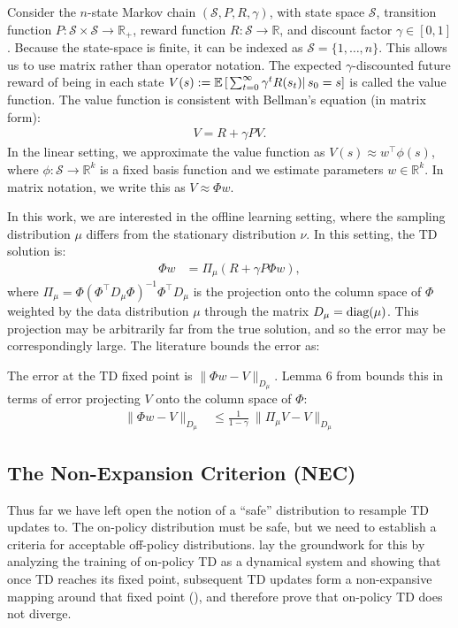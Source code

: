 Consider the $n$-state Markov chain $(\mathcal S, P, R, \gamma)$, with state space $\mathcal S$, transition function $P : \mathcal{S} \times \mathcal{S} \to \mathbb{R}_+$, reward function $R : \mathcal S \to \mathbb R$, and discount factor $\gamma \in [0, 1]$.
Because the state-space is finite, it can be indexed as $\mathcal{S} = \{1, \ldots, n\}$.
This allows us to use matrix rather than operator notation.
The expected $\gamma$-discounted future reward of being in each state $V(s) := \mathbb{E} \left[\left.\sum_{t=0}^\infty \gamma^t R(s_t) \right| s_0 = s \right]$ is called the value function.
The value function is consistent with Bellman's equation (in matrix form):
\begin{align}
  V = R + \gamma P V .
\end{align}
In the linear setting, we approximate the value function as $V(s) \approx w^\top \phi(s)$, where $\phi : \mathcal S \to \mathbb R^{k}$ is a fixed basis function and we estimate parameters $w \in \mathbb R^k$. In matrix notation, we write this as $V \approx \Phi w$.

In this work, we are interested in the offline learning setting, where the sampling distribution $\mu$ differs from the stationary distribution $\nu$.
In this setting, the TD solution is:
\begin{align}
  \Phi w & = \Pi_{\mu} (R + \gamma P \Phi w) ,
\end{align}
where $\Pi_\mu = \Phi(\Phi^\top D_{\mu} \Phi)^{-1}\Phi^\top D_{\mu}$ is the projection onto the column space of $\Phi$ weighted by the data distribution $\mu$ through the matrix $D_{\mu} = \text{diag}(\mu)$. This projection may be arbitrarily far from the true solution, and so the error may be correspondingly large. The literature bounds the error as:
\begin{theorem}
  The error at the TD fixed point is $\|\Phi w - V \|_{D_\mu}$. Lemma 6 from \cite{tsitsiklis1996analysis} bounds this in terms of error projecting $V$ onto the column space of $\Phi$:
  \begin{align}
    \|\Phi w - V \|_{D_\mu} & \leq \frac{1}{1-\gamma} ~ \| \Pi_{\mu} V - V \|_{D_\mu}
  \end{align} \label{thm:boundTDError}
\end{theorem}

\subsection{The Non-Expansion Criterion (NEC)}
Thus far we have left open the notion of a ``safe'' distribution to resample TD updates to. The on-policy distribution must be safe, but we need to establish a criteria for acceptable off-policy distributions. \citeauthor{tsitsiklis1996analysis} lay the groundwork for this by analyzing the training of on-policy TD as a dynamical system and showing that once TD reaches its fixed point, subsequent TD updates form a non-expansive mapping around that fixed point (\citeyear[lemma 4]{tsitsiklis1996analysis}), and therefore prove that on-policy TD does not diverge.

